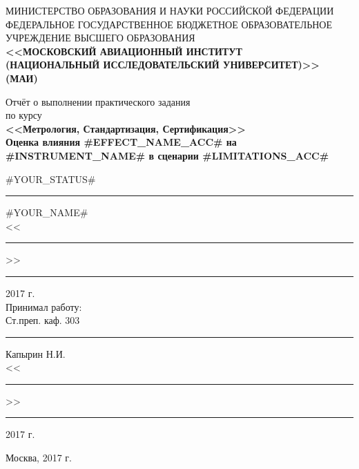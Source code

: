 \documentclass[12pt]{article}   %
\begin{document}
\thispagestyle{empty}
\begin{center}

{\scriptsize
МИНИСТЕРСТВО ОБРАЗОВАНИЯ И НАУКИ РОССИЙСКОЙ ФЕДЕРАЦИИ\\[.2cm]

ФЕДЕРАЛЬНОЕ ГОСУДАРСТВЕННОЕ БЮДЖЕТНОЕ ОБРАЗОВАТЕЛЬНОЕ\\[.2cm]

УЧРЕЖДЕНИЕ ВЫСШЕГО ОБРАЗОВАНИЯ\\[.2cm]

\textbf{<<МОСКОВСКИЙ АВИАЦИОННЫЙ ИНСТИТУТ}\\[.2cm]

\textbf{(НАЦИОНАЛЬНЫЙ ИССЛЕДОВАТЕЛЬСКИЙ УНИВЕРСИТЕТ)>> (МАИ)}\\[.2cm]
}

\vfill
{\large
Отчёт о выполнении практического задания\\
по курсу\\
\textbf{<<Метрология, Стандартизация, Сертификация>>}\\[0.4cm]
\bfseries Оценка влияния #EFFECT_NAME_ACC# на #INSTRUMENT_NAME# в сценарии #LIMITATIONS_ACC#\\[2cm]}

\vfill

\begin{minipage}[t]{0.7\textwidth}
    \begin{flushright}
	#YOUR_STATUS#\\[.4cm]
	\rule{4cm}{1pt} #YOUR_NAME#\\
	<<\rule{.8cm}{1pt}>> \rule{3cm}{1pt} 2017 г.\\\bigskip
	Принимал работу:\\
	Ст.преп. каф. 303\\[.4cm]
	\rule{4cm}{1pt} Капырин Н.И.\\
	<<\rule{.8cm}{1pt}>> \rule{3cm}{1pt} 2017 г.
    \end{flushright}
\end{minipage}

\vfill

{\large Москва, 2017 г.}
\end{center}
\end{document}
